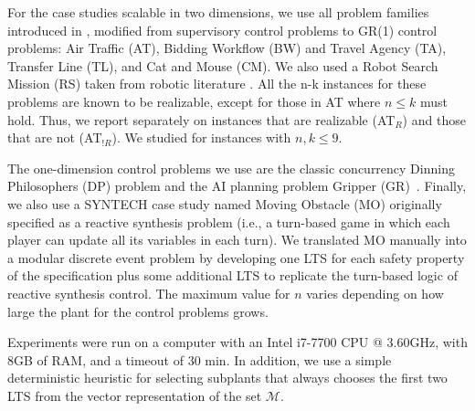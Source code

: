 For the case studies scalable in two dimensions, we use all problem families introduced in \cite{Ciolek2020}, modified from supervisory control problems to GR(1) control problems: Air Traffic (AT), Bidding Workflow (BW) and Travel Agency (TA), Transfer Line (TL), and Cat and Mouse (CM). We also used a Robot Search Mission (RS) taken from robotic literature \cite{zudaire_assured_2021}.  
All the n-k instances for these problems are known to be realizable, except for those in AT where $n \leq k$ must hold. Thus, we report separately on instances that are realizable (AT$_R$) and those that are not (AT$_{!R}$). We studied for instances with $n, k \leq 9$.

The one-dimension control problems we use are the classic concurrency Dinning Philosophers (DP) problem and the AI planning problem Gripper (GR)~\cite{DBLP:journals/corr/abs-2305-11014}. Finally, we also use a SYNTECH \cite{maoz2021spectra} case study named Moving Obstacle (MO) originally specified as a reactive synthesis problem (i.e., a turn-based game in which each player can update all its variables in each turn).  We translated MO manually into a modular discrete event problem by developing one LTS for each safety property of the specification plus some additional LTS to replicate the turn-based logic of reactive synthesis control. The maximum value for $n$ varies depending on how large the plant for the control problems grows.

Experiments were run on a computer with an Intel i7-7700 CPU @ 3.60GHz, with 8GB of RAM, and a timeout of 30 min. In addition, we use a simple deterministic heuristic for selecting subplants that always chooses the first two LTS from the vector representation of the set $\mathcal{M}$.



